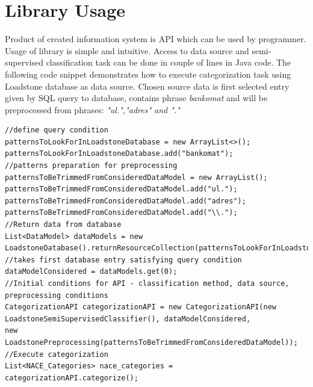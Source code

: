 \section{Library Usage}
Product of created information system is API which can be used by programmer. Usage of library is simple and intuitive. Access to data source and semi-supervised classification task can be done in couple of lines in Java code. The following code snippet demonstrates how to execute categorization task using Loadstone database as data source. Chosen source data is first selected entry given by SQL query to database, contains phrase \textit{bankomat} and will be preprocessed from phrases: \textit{"ul.","adres" and "."}
\begin{lstlisting}[style=JAVA]
//define query condition
patternsToLookForInLoadstoneDatabase = new ArrayList<>();
patternsToLookForInLoadstoneDatabase.add("bankomat");
//patterns preparation for preprocessing
patternsToBeTrimmedFromConsideredDataModel = new ArrayList();
patternsToBeTrimmedFromConsideredDataModel.add("ul.");
patternsToBeTrimmedFromConsideredDataModel.add("adres");
patternsToBeTrimmedFromConsideredDataModel.add("\\.");
//Return data from database
List<DataModel> dataModels = new LoadstoneDatabase().returnResourceCollection(patternsToLookForInLoadstoneDatabase);
//takes first database entry satisfying query condition
dataModelConsidered = dataModels.get(0);
//Initial conditions for API - classification method, data source, preprocessing conditions
CategorizationAPI categorizationAPI = new CategorizationAPI(new LoadstoneSemiSupervisedClassifier(), dataModelConsidered,
new LoadstonePreprocessing(patternsToBeTrimmedFromConsideredDataModel));
//Execute categorization
List<NACE_Categories> nace_categories = categorizationAPI.categorize();
\end{lstlisting}